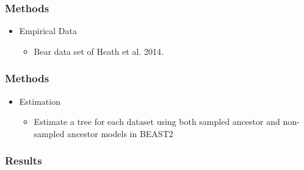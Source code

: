 \documentclass[]{beamer}
\begin{document}
\begin{frame}
\frametitle{Methods}
\begin{itemize}
\item Empirical Data
\begin{itemize}
\item Bear data set of Heath et al. 2014.
\end{itemize}
\end{itemize}
\end{frame}

\begin{frame}
\frametitle{Methods}
\begin{itemize}
\item Estimation
\begin{itemize}
\item Estimate a tree for each dataset using both sampled ancestor and non-sampled ancestor models in BEAST2
\end{itemize}
\end{itemize}
\end{frame}

\begin{frame}
\frametitle{Results}
\end{frame}
\end{document}
